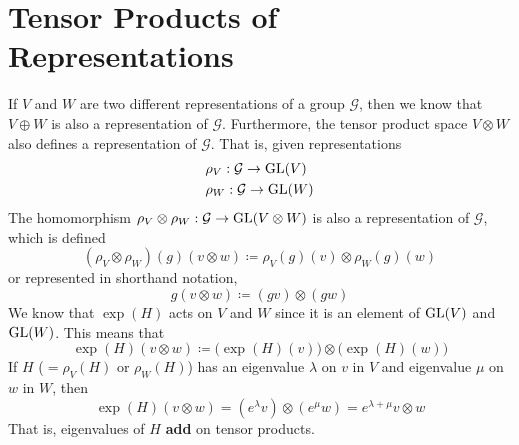 \section{Tensor Products of Representations}

  \begin{definition}
    \label{def:tensor-product-of-representations}
    If $V$ and $W$ are two different representations of a group $\mathcal{G}$, then we know that $V \oplus W$ is also a representation of $\mathcal{G}$. Furthermore, the tensor product space $V \otimes W$ also defines a representation of $\mathcal{G}$. That is, given representations
    \begin{align*}
      & \rho_V: \mathcal{G} \rightarrow \operatorname{GL}(V) \\
      & \rho_W: \mathcal{G} \rightarrow \operatorname{GL}(W)
    \end{align*}
    The homomorphism $\rho_V \otimes \rho_W: \mathcal{G} \rightarrow \operatorname{GL}(V \otimes W)$ is also a representation of $\mathcal{G}$, which is defined
    \begin{equation}
      (\rho_V \otimes \rho_W)(g) (v \otimes w) \coloneqq \rho_V (g) (v) \otimes \rho_W (g) (w)
    \end{equation}
    or represented in shorthand notation, 
    \begin{equation}
      g(v \otimes w) \coloneqq (g v) \otimes (g w)
    \end{equation}
    We know that $\exp(H)$ acts on $V$ and $W$ since it is an element of $\operatorname{GL}(V)$ and $\operatorname{GL}(W)$. This means that
    \begin{equation}
      \exp(H)(v \otimes w) \coloneqq \big( \exp(H)(v)\big) \otimes \big( \exp(H)(w)\big)
    \end{equation}
    If $H$ ($= \rho_V (H)$ or $\rho_W(H)$) has an eigenvalue $\lambda$ on $v$ in $V$ and eigenvalue $\mu$ on $w$ in $W$, then 
    \begin{equation}
      \exp(H) (v \otimes w) = (e^\lambda v) \otimes (e^\mu w) = e^{\lambda + \mu} v \otimes w
    \end{equation}
    That is, eigenvalues of $H$ \textbf{add} on tensor products. 
  \end{definition}

